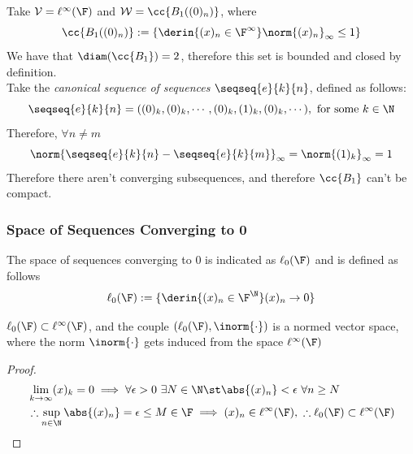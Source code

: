 \documentclass[../mmf.tex]{subfiles}
\begin{document}
\begin{eg}
	Take $\mathcal{V}=\ell^\infty(\F)$ and $\mathcal{W}=\cc{B_1( (0)_n )}$, where $$\cc{B_1( (0)_n )}:=\{\derin{(x)_n\in\F^\infty}\norm{(x)_n}_\infty\le1\}$$
	We have that $\diam(\cc{B_1})=2$, therefore this set is bounded and closed by definition.\\
	Take the \textit{canonical sequence of sequences} $\seqseq{e}{k}{n}$, defined as follows:
	\begin{equation*}
		\seqseq{e}{k}{n}=((0)_k,(0)_k,\cdots,(0)_k,(1)_k,(0)_k,\cdots),\ \text{for some}\ k\in\N
	\end{equation*}
	Therefore, $\forall n\ne m$
	\begin{equation*}
		\norm{\seqseq{e}{k}{n}-\seqseq{e}{k}{m}}_{\infty}=\norm{(1)_k}_\infty=1
	\end{equation*}
	Therefore there aren't converging subsequences, and therefore $\cc{B_1}$ can't be compact.
\end{eg}
\subsubsection{Space of Sequences Converging to 0}
\begin{dfn}
	The space of sequences converging to $0$ is indicated as $\ell_0(\F)$ and is defined as follows
	\begin{equation}
		\ell_0(\F):=\{\derin{(x)_n\in\F^{\N}}(x)_n\to0\}
		\label{eq:ellnot}
	\end{equation}
\end{dfn}
\begin{prop}
	$\ell_0(\F)\subset\ell^\infty(\F)$, and the couple $(\ell_0(\F),\inorm{\cdot})$ is a normed vector space, where the norm $\inorm{\cdot}$ gets induced from the space $\ell^\infty(\F)$
\end{prop}
\begin{proof}
	\begin{equation*}
		\begin{aligned}
			&\lim_{k\to\infty}(x)_k=0\implies{}\forall\epsilon>0\ \exists N\in\N\st\abs{(x)_n}<\epsilon\ \forall n\ge N\\
			&\therefore\sup_{n\in\N}\abs{(x)_n}=\epsilon\le M\in\F\implies{}(x)_n\in\ell^\infty(\F),\ \therefore\ell_0(\F)\subset\ell^\infty(\F)
		\end{aligned}
	\end{equation*}
\end{proof}
\end{document}
